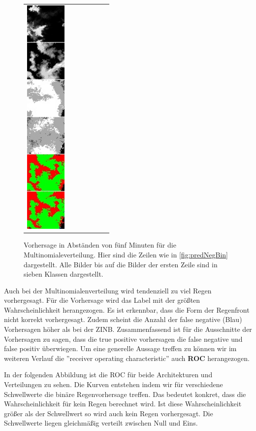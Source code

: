\begin{figure}[h]
\begin{tabular}{lllllll}
\includegraphics[width=20mm]{abb/prediction/106_cat_maxCont}
\end{tabular}
\caption{Vorhersage in Abständen von fünf Minuten für die Multinomialeverteilung. Hier sind die Zeilen wie in \ref{fig:predNegBin} dargestellt. Alle Bilder bis auf die Bilder der ersten Zeile sind in sieben Klassen dargestellt.\label{fig:predCat}}
\end{figure}


\noindent Auch bei der Multinomialenverteilung wird tendenziell zu viel Regen vorhergesagt. Für die Vorhersage wird das Label mit der größten Wahrscheinlichkeit herangezogen. Es ist erkennbar, dass die Form der Regenfront nicht korrekt vorhergesagt. Zudem scheint die Anzahl der false negative (Blau) Vorhersagen höher als bei der ZINB. Zusammenfassend ist für die Ausschnitte der Vorhersagen zu sagen, dass die true positive vorhersagen die false negative und false positiv überwiegen. Um eine generelle Aussage treffen zu können wir im weiteren Verlauf die ''receiver operating characteristic'' auch \textbf{ROC} herangezogen.


\noindent In der folgenden Abbildung ist die ROC für beide Architekturen und Verteilungen zu sehen. Die Kurven entstehen indem wir für verschiedene Schwellwerte die binäre Regenvorhersage treffen. Das bedeutet konkret, dass die Wahrscheinlichkeit für kein Regen berechnet wird. Ist diese Wahrscheinlichkeit größer als der Schwellwert so wird auch kein Regen vorhergesagt.
Die Schwellwerte liegen gleichmäßig verteilt zwischen Null und Eins.


